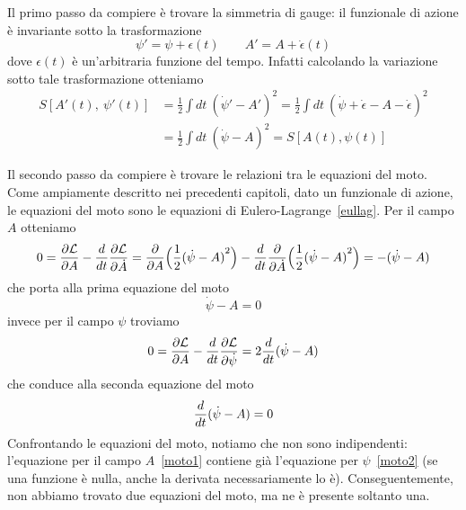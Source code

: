     Il primo passo da compiere è trovare la simmetria di gauge: il funzionale di azione è invariante sotto la trasformazione
    \begin{equation}\label{arbitraria}
        \psi' = \psi + \epsilon(t) \qquad A' = A + \dot \epsilon(t)
    \end{equation}
    dove $\epsilon(t)$ è un'arbitraria funzione del tempo. Infatti calcolando la variazione sotto tale trasformazione otteniamo 
    \begin{equation*}
    \begin{aligned}
        S[A'(t),~\psi'(t)] & = \frac{1}{2} \int dt ~ {(\dot \psi' - A')}^2 = \frac{1}{2} \int dt ~ {(\dot \psi + \dot \epsilon - A - \dot \epsilon )}^2 \\ & = \frac{1}{2} \int dt ~ {(\dot \psi - A)}^2 = S[A(t),\psi(t)]
    \end{aligned}
    \end{equation*}
    
    Il secondo passo da compiere è trovare le relazioni tra le equazioni del moto. Come ampiamente descritto nei precedenti capitoli, dato un funzionale di azione, le equazioni del moto sono le equazioni di Eulero-Lagrange~\eqref{eullag}.
    Per il campo $A$ otteniamo 
    \begin{equation*}
        0 = \frac{\partial\mathcal L}{\partial A} - \frac{d}{dt} \frac{\partial\mathcal L}{\partial\dot A} = \frac{\partial}{\partial A} \Big (\frac{1}{2} {(\dot \psi - A)}^2 \Big ) - \frac{d}{dt} \frac{\partial}{\partial\dot A} \Big (\frac{1}{2} {(\dot \psi - A)}^2 \Big ) = - (\dot \psi - A)
    \end{equation*}
    che porta alla prima equazione del moto 
    \begin{equation} \label{moto1}
        \dot \psi - A = 0
    \end{equation}
    invece per il campo $\psi$ troviamo
    \begin{equation*}
        0 = \frac{\partial\mathcal L}{\partial A} - \frac{d}{dt} \frac{\partial\mathcal L}{\partial\dot \psi} = 2 \frac{d}{dt} (\dot \psi - A)
    \end{equation*}
    che conduce alla seconda equazione del moto 
    \begin{equation} \label{moto2}
        \frac{d}{dt} (\dot \psi - A) = 0
    \end{equation}
    Confrontando le equazioni del moto, notiamo che non sono indipendenti: l'equazione per il campo $A$~\eqref{moto1} contiene già l'equazione per $\psi$~\eqref{moto2} (se una funzione è nulla, anche la derivata necessariamente lo è). Conseguentemente, non abbiamo trovato due equazioni del moto, ma ne è presente soltanto una. 
    
